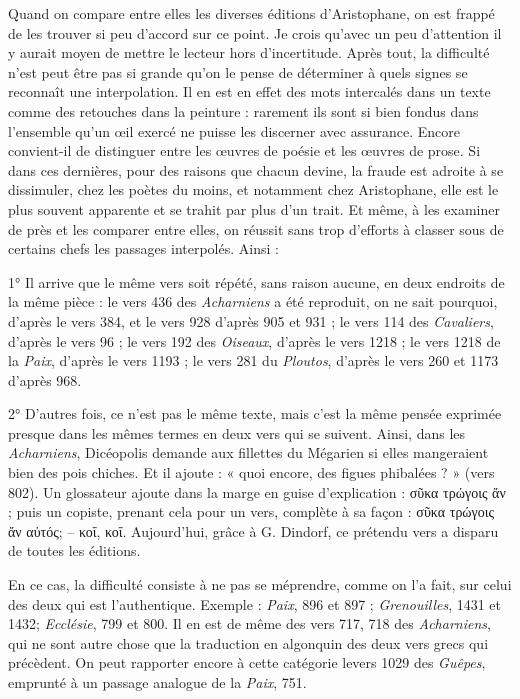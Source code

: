 \documentclass{book}%
\newcommand{\italique}[1]{\textit{#1}}%
\begin{document}
Quand on compare entre elles les diverses éditions d'Aristophane, on est frappé de les trouver si peu d'accord sur ce point. Je crois qu'avec un peu d'attention il y aurait moyen de mettre le lecteur hors d'incertitude. Après tout, la difficulté n'est peut être pas si grande qu'on le pense de déterminer à quels signes se reconnaît une interpolation. Il en est en effet des mots intercalés dans un texte comme des retouches dans la peinture : rarement ils sont si bien fondus dans l'ensemble qu'un œil exercé ne puisse les discerner avec assurance. Encore convient-il de distinguer entre les œuvres de poésie et les œuvres de prose. Si dans ces dernières, pour des raisons que chacun devine, la fraude est adroite à se dissimuler, chez les poètes du moins, et notamment chez Aristophane, elle est le plus souvent apparente et se trahit par plus d'un trait. Et même, à les examiner de près et les comparer entre elles, on réussit sans trop d'efforts à classer sous de certains chefs les passages interpolés. Ainsi : 

1°  	 Il arrive que le même vers soit répété, sans raison aucune, en deux endroits de la même pièce : le vers 436 des \italique{Acharniens} a été reproduit, on ne sait pourquoi, d'après le vers 384, et le vers 928 d'après 905 et 931 ; le vers 114 des \italique{Cavaliers}, d'après le vers 96 ; le vers 192 des \italique{Oiseaux}, d'après le vers 1218 ; le vers 1218 de la \italique{Paix}, d'après le vers 1193 ; le vers 281 du \italique{Ploutos}, d'après le vers 260 et 1173 d'après 968.

2° 	 D'autres fois, ce n'est pas le même texte, mais c'est la même pensée exprimée presque dans les mêmes termes en deux vers qui se suivent. Ainsi, dans les \italique{Acharniens}, Dicéopolis demande aux fillettes du Mégarien si elles mangeraient bien des pois chiches. Et il ajoute : « quoi encore, des figues phibalées ? » (vers 802). Un glossateur ajoute dans la marge en guise d'explication :  σῦκα τρώγοις ἄν ; puis un copiste, prenant cela pour un vers, complète à sa façon : σῦκα τρώγοις ἄν αὐτός; -- κοΐ, κοΐ. Aujourd'hui, grâce à G. Dindorf, ce prétendu vers a disparu de toutes les éditions. 

En ce cas, la difficulté consiste à ne pas se méprendre, comme on l'a fait, sur celui des deux qui est l'authentique. Exemple : \italique{Paix}, 896 et 897 ; \italique{Grenouilles}, 1431 et 1432; \italique{Ecclésie}, 799 et 800. Il en est de même des vers 717, 718 des \italique{Acharniens}, qui ne sont autre chose que la traduction en algonquin des deux vers grecs qui précèdent. On peut rapporter encore à cette catégorie levers 1029 des \italique{Guêpes}, emprunté à un passage analogue de la \italique{Paix}, 751. 
\end{document}
